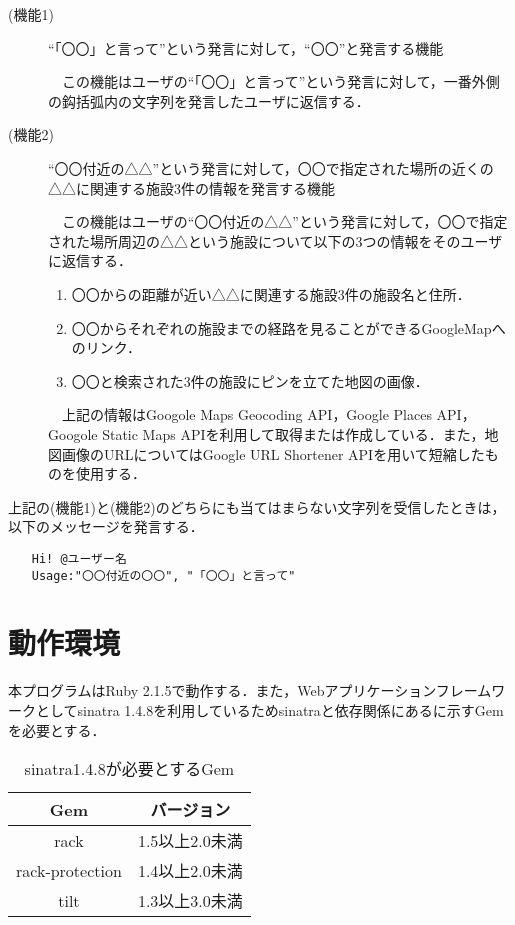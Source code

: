 \documentclass[fleqn, 14pt]{extarticlej}
\begin{document}
\begin{description}
\item[(機能1)]``「〇〇」と言って''という発言に対して，``〇〇''と発言する機能
  
  　この機能はユーザの``「〇〇」と言って''という発言に対して，一番外側の鈎括弧内の文字列を発言したユーザに返信する．
\item[(機能2)]``〇〇付近の△△''という発言に対して，〇〇で指定された場所の近くの△△に関連する施設3件の情報を発言する機能
  
  　この機能はユーザの``〇〇付近の△△''という発言に対して，〇〇で指定された場所周辺の△△という施設について以下の3つの情報をそのユーザに返信する．

\begin{enumerate}
  \item 〇〇からの距離が近い△△に関連する施設3件の施設名と住所．
  \item 〇〇からそれぞれの施設までの経路を見ることができるGoogleMapへのリンク．
  \item 〇〇と検索された3件の施設にピンを立てた地図の画像． 
\end{enumerate}

　上記の情報はGoogole Maps Geocoding API\cite{GoogleGeocodingAPI}，Google Places API\cite{GooglePlacesAPI}，Googole Static Maps API\cite{GoogleStaticMapsAPI}を利用して取得または作成している．また，地図画像のURLについてはGoogle URL Shortener API\cite{GoogleURLShortenerAPI}を用いて短縮したものを使用する．

\end{description}

上記の(機能1)と(機能2)のどちらにも当てはまらない文字列を受信したときは，以下のメッセージを発言する．

\begin{verbatim}
　　Hi! @ユーザー名
　　Usage:"〇〇付近の〇〇", "「〇〇」と言って"
\end{verbatim}

\section{動作環境}
本プログラムはRuby 2.1.5で動作する．また，Webアプリケーションフレームワークとしてsinatra 1.4.8を利用しているためsinatraと依存関係にあるに示すGemを必要とする．


\begin{table}[t]
  \begin{center}
    \caption{sinatra1.4.8が必要とするGem}
    \label{tab:sinatra_dependent}
    \begin{tabular}{|c|c|} \hline
      Gem & バージョン \\ \hline \hline
      rack & 1.5以上2.0未満 \\
      rack-protection & 1.4以上2.0未満 \\
      tilt & 1.3以上3.0未満 \\ \hline
    \end{tabular}
  \end{center}
\end{table}
\end{document}
